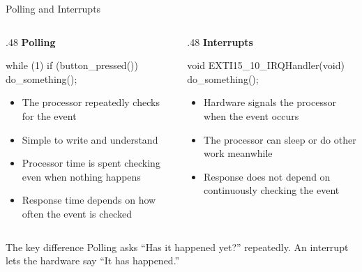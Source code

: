 \documentclass[9pt,aspectratio=169,xcolor=table]{beamer}
\begin{document}
\begin{frame}[fragile]{Polling and Interrupts}
	\begin{columns}[T]
		\begin{column}{.48\textwidth}
			\textbf{Polling}

			\vspace{1mm}
			\begin{cc}[basicstyle=\ttfamily\small]
while (1) {
	if (button_pressed())
		do_something();
}
			\end{cc}

			\vspace{5mm}
			{\small
				\begin{itemize}\itemsep1pt
					\item The processor \alert{repeatedly checks} for the event
					\item Simple to write and understand
					\item Processor time is spent checking even when nothing happens
					\item Response time depends on how often the event is checked
			\end{itemize}}
		\end{column}

		\begin{column}{.48\textwidth}
			\textbf{Interrupts}

			\vspace{1mm}
			\begin{cc}[basicstyle=\ttfamily\small]
void EXTI15_10_IRQHandler(void) {
	do_something();
}
			\end{cc}

			\vspace{5mm}
			{\small
				\begin{itemize}\itemsep1pt
					\item Hardware signals the processor when the event occurs
					\item The processor can sleep or do other work meanwhile
					\item Response does not depend on continuously checking the event
			\end{itemize}}
		\end{column}
	\end{columns}

	\vspace{3mm}
	\begin{block}{The key difference}
		\alert{Polling asks ``Has it happened yet?'' repeatedly.}
		An interrupt lets the hardware say ``It has happened.''
	\end{block}
\end{frame}
\end{document}
